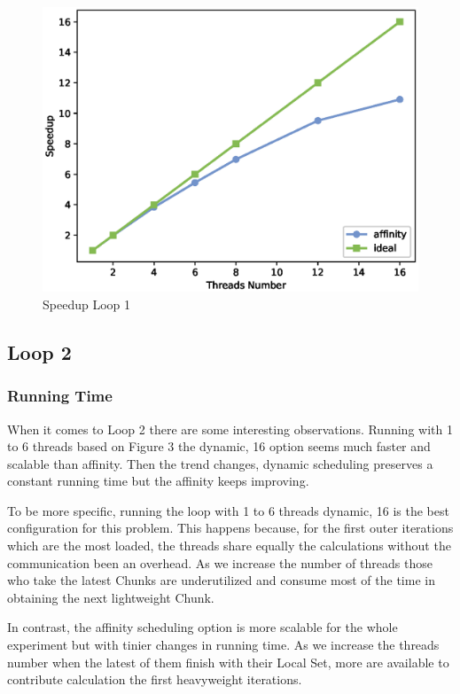 \documentclass[12pt,a4paper]{article}
\begin{document}
\begin{figure}[ht]
    \centering
    \includegraphics[scale=0.6]{../graphs/loop1_speedup.eps}
    \caption{Speedup Loop 1}
    \label{Speedup Loop 1}
\end{figure}

\subsection{Loop 2}

\subsubsection{Running Time}

When it comes to Loop 2 there are some interesting observations. Running with 1 to 6 threads based on Figure 3 the dynamic, 16 option seems much faster and scalable than affinity. Then the trend changes, dynamic scheduling preserves a constant running time but the affinity keeps improving.

To be more specific, running the loop with 1 to 6 threads dynamic, 16 is the best configuration for this problem. This happens because, for the first outer iterations which are the most loaded, the threads share equally the calculations without the communication been an overhead. As we increase the number of threads those who take the latest Chunks are underutilized and consume most of the time in obtaining the next lightweight Chunk.

In contrast, the affinity scheduling option is more scalable for the whole experiment but with tinier changes in running time. As we increase the threads number when the latest of them finish with their Local Set, more are available to contribute calculation the first heavyweight iterations.
\end{document}
